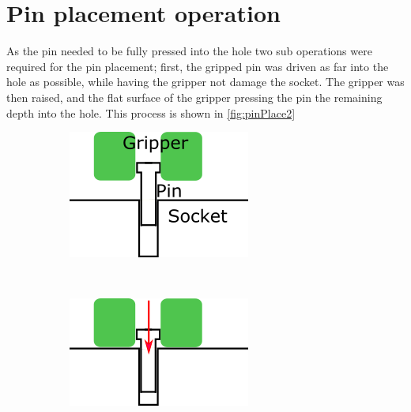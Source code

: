 \documentclass[11pt,a4paper, margin=1in]{report}
\begin{document}
\section{Pin placement operation}\label{driving}
As the pin needed to be fully pressed into the hole two sub operations were required for the pin placement; first, the gripped pin was driven as far into the hole as possible, while having the gripper not damage the socket. The gripper was then raised, and the flat surface of the gripper pressing the pin the remaining depth into the hole. 
This process is shown in \cref{fig:pinPlace2}
\begin{figure}[h]
\centering
	\begin{subfigure}{0.4\linewidth}
\includegraphics[width=\linewidth]{pinPlace1}
\end{subfigure} \ \ \
	\begin{subfigure}{0.4\linewidth}
		\includegraphics[width=\linewidth]{pinPlace2}

\end{subfigure}
\end{figure}
\end{document}
